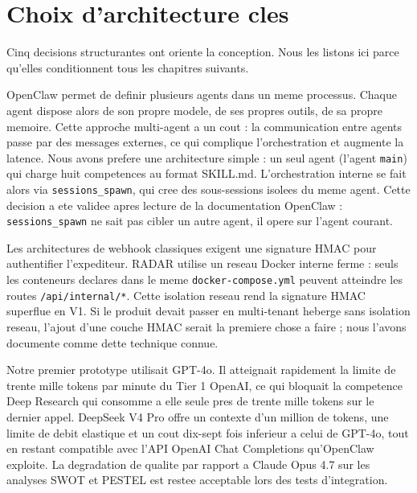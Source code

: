 \documentclass[12pt,a4paper,openany]{report}
\begin{document}
\section{Choix d'architecture cles}
\label{sec:choix-architecture}

Cinq decisions structurantes ont oriente la conception. Nous les listons ici parce qu'elles conditionnent tous les chapitres suivants.

\begin{decisionBox}[title={Decision 1 : un seul agent OpenClaw avec huit competences, et non huit agents distincts}]
OpenClaw permet de definir plusieurs agents dans un meme processus. Chaque agent dispose alors de son propre modele, de ses propres outils, de sa propre memoire. Cette approche multi-agent a un cout : la communication entre agents passe par des messages externes, ce qui complique l'orchestration et augmente la latence. Nous avons prefere une architecture simple : un seul agent (l'agent \texttt{main}) qui charge huit competences au format SKILL.md. L'orchestration interne se fait alors via \texttt{sessions\_spawn}, qui cree des sous-sessions isolees du meme agent. Cette decision a ete validee apres lecture de la documentation OpenClaw : \texttt{sessions\_spawn} ne sait pas cibler un autre agent, il opere sur l'agent courant.
\end{decisionBox}

\begin{decisionBox}[title={Decision 2 : communication agent vers web via HTTP interne, sans signature HMAC}]
Les architectures de webhook classiques exigent une signature HMAC pour authentifier l'expediteur. RADAR utilise un reseau Docker interne ferme : seuls les conteneurs declares dans le meme \texttt{docker-compose.yml} peuvent atteindre les routes \texttt{/api/internal/*}. Cette isolation reseau rend la signature HMAC superflue en V1. Si le produit devait passer en multi-tenant heberge sans isolation reseau, l'ajout d'une couche HMAC serait la premiere chose a faire ; nous l'avons documente comme dette technique connue.
\end{decisionBox}

\begin{decisionBox}[title={Decision 3 : modele LLM DeepSeek V4 Pro, et non GPT-4o ni Claude Opus}]
Notre premier prototype utilisait GPT-4o. Il atteignait rapidement la limite de trente mille tokens par minute du Tier 1 OpenAI, ce qui bloquait la competence Deep Research qui consomme a elle seule pres de trente mille tokens sur le dernier appel. DeepSeek V4 Pro offre un contexte d'un million de tokens, une limite de debit elastique et un cout dix-sept fois inferieur a celui de GPT-4o, tout en restant compatible avec l'API OpenAI Chat Completions qu'OpenClaw exploite. La degradation de qualite par rapport a Claude Opus 4.7 sur les analyses SWOT et PESTEL est restee acceptable lors des tests d'integration.
\end{decisionBox}
\end{document}
